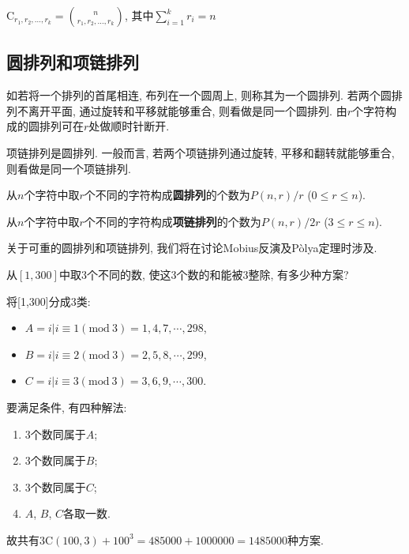         \begin{theorem}\rm
            $\mathrm{C}_{r_1,r_2,\ldots,r_k}={n\choose r_1,r_2,\ldots,r_k}$, 其中$\sum_{i=1}^kr_i=n$
        \end{theorem}

    \subsection{圆排列和项链排列}

        \begin{definition}[圆排列]
            如若将一个排列的首尾相连, 布列在一个圆周上, 则称其为一个\textsf{圆排列}. 若两个圆排列不离开平面, 通过旋转和平移就能够重合, 则看做是同一个圆排列. 由$r$个字符构成的圆排列可在$r$处做顺时针断开.
        \end{definition}

        \begin{definition}[项链排列]
            \textsf{项链排列}是圆排列. 一般而言, 若两个项链排列通过旋转, 平移和翻转就能够重合, 则看做是同一个项链排列. 
        \end{definition}

        \begin{theorem}\rm
            从$n$个字符中取$r$个不同的字符构成\textbf{圆排列}的个数为$P(n,r)/r$ ($0\leqslant r\leqslant n$).

            从$n$个字符中取$r$个不同的字符构成\textbf{项链排列}的个数为$P(n,r)/2r$ ($3\leqslant r\leqslant n$).
        \end{theorem}

        关于可重的圆排列和项链排列, 我们将在讨论Mobius反演及P\`olya定理时涉及.

        \begin{example}
            从$[1,300]$中取3个不同的数, 使这3个数的和能被3整除, 有多少种方案? 

            \begin{sol}
                将[1,300]分成3类: 
                \begin{itemize}
                    \item $A={i|i\equiv1(\mathrm{mod\ }3)}={1,4,7,\cdots,298}$,
                    \item $B={i|i\equiv2(\mathrm{mod\ }3)}={2,5,8,\cdots,299}$,
                    \item $C={i|i\equiv3(\mathrm{mod\ }3)}={3,6,9,\cdots,300}$.
                \end{itemize}
                要满足条件, 有四种解法: 
                \begin{enumerate}
                    \item 3个数同属于$A$;
                    \item 3个数同属于$B$;
                    \item 3个数同属于$C$;
                    \item $A$, $B$, $C$各取一数.
                \end{enumerate}
                故共有$3\mathrm{C}(100,3)+100^3=485000+1000000=1485000$种方案.
            \end{sol}
        \end{example}


